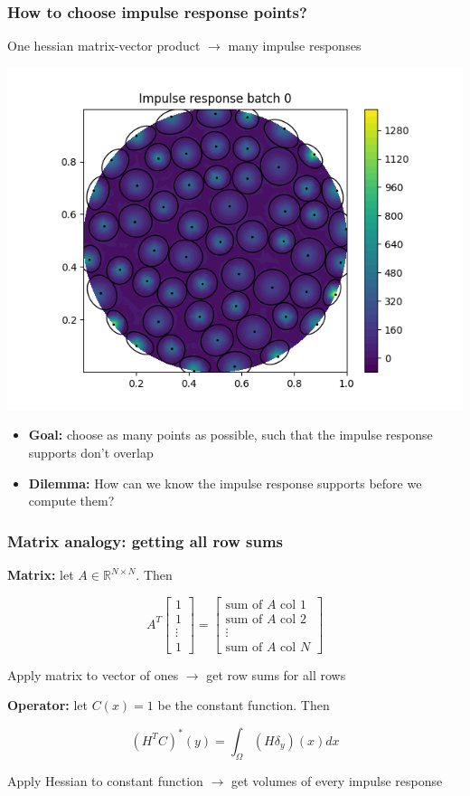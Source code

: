\documentclass[10pt,final,xcolor=dvipsnames]{beamer}
\begin{document}
\begin{frame}
	\frametitle{How to choose impulse response points?}
	One hessian matrix-vector product $\rightarrow$ many impulse responses
	\begin{center}
		\includegraphics[width=0.5\columnwidth]{IRB1.png} 
	\end{center}
	\begin{itemize}
		\item \textbf{Goal:} choose as many points as possible, such that the impulse response supports don't overlap
		\item \textbf{Dilemma:} How can we know the impulse response supports before we compute them?
	\end{itemize}
\end{frame}
\begin{frame}
	\frametitle{Matrix analogy: getting all row sums}
	
\textbf{Matrix:} let $A \in \mathbb{R}^{N \times N}$. Then
	
	$$A^T \begin{bmatrix}
	1 \\ 1 \\ \vdots \\ 1
	\end{bmatrix} = \begin{bmatrix}
	\text{sum of }A \text{ col }1 \\
	\text{sum of }A \text{ col }2 \\
	\vdots \\
	\text{sum of }A \text{ col }N
	\end{bmatrix}$$

Apply matrix to vector of ones $\rightarrow$ get row sums for all rows

\vspace{3em}

\textbf{Operator:} let $C(x)=1$ be the constant function. Then 

	$$(H^T C)^*(y) = \int_\Omega \left(H \delta_y\right)(x) dx$$
	

Apply Hessian to constant function $\rightarrow$ get volumes of every impulse response
\end{frame}
\end{document}
